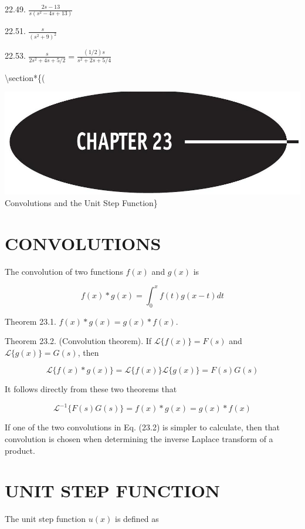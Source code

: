 \documentclass[10pt]{article}
\begin{document}
22.49. $\frac{2 s-13}{s\left(s^{2}-4 s+13\right)}$

22.51. $\frac{s}{\left(s^{2}+9\right)^{2}}$

22.53. $\frac{s}{2 s^{2}+4 s+5 / 2}=\frac{(1 / 2) s}{s^{2}+2 s+5 / 4}$

\textbackslash section*\{(

\includegraphics[max width=\textwidth]{2024_04_03_5bb5b4275a64cb9887d1g-251} \\
 Convolutions and the Unit Step Function\}

\section*{CONVOLUTIONS}
The convolution of two functions $f(x)$ and $g(x)$ is


\begin{equation*}
f(x) * g(x)=\int_{0}^{x} f(t) g(x-t) d t \tag{23.1}
\end{equation*}


Theorem 23.1. $f(x) * g(x)=g(x) * f(x)$.

Theorem 23.2. (Convolution theorem). If $\mathscr{L}\{f(x)\}=F(s)$ and $\mathscr{L}\{g(x)\}=G(s)$, then

$$
\mathscr{L}\{f(x) * g(x)\}=\mathscr{L}\{f(x)\} \mathscr{L}\{g(x)\}=F(s) G(s)
$$

It follows directly from these two theorems that


\begin{equation*}
\mathscr{L}^{-1}\{F(s) G(s)\}=f(x) * g(x)=g(x) * f(x) \tag{23.2}
\end{equation*}


If one of the two convolutions in Eq. (23.2) is simpler to calculate, then that convolution is chosen when determining the inverse Laplace transform of a product.

\section*{UNIT STEP FUNCTION}
The unit step function $u(x)$ is defined as
\end{document}
